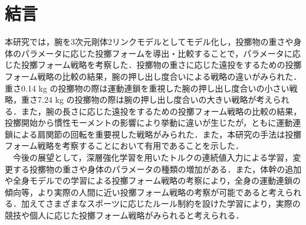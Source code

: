 \section{結言}
本研究では，腕を3次元剛体2リンクモデルとしてモデル化し，投擲物の重さや身体のパラメータに応じた投擲フォームを導出・比較することで，パラメータに応じた投擲フォーム戦略を考察した．投擲物の重さに応じた遠投をするための投擲フォーム戦略の比較の結果，腕の押し出し度合いによる戦略の違いがみられた．重さ0.14 kg の投擲物の際は運動連鎖を重視した腕の押し出し度合いの小さい戦略，重さ7.24 kg の投擲物の際は腕の押し出し度合いの大きい戦略が考えられる．また，腕の長さに応じた遠投をするための投擲フォーム戦略の比較の結果，投擲開始から慣性モーメントの影響により挙動に違いが生じたが，ともに運動連鎖による肩関節の回転を重要視した戦略がみられた．また，本研究の手法は投擲フォーム戦略を考察することにおいて有用であることを示した．\\
　今後の展望として，深層強化学習を用いたトルクの連続値入力による学習，変更する投擲物の重さや身体のパラメータの種類の増加がある．また，体幹の追加や全身モデルでの学習による投擲フォーム戦略の考察により，全身の運動連鎖の傾向等，より実際の人間に近い投擲フォーム戦略の考察が可能であると考えられる．加えてさまざまなスポーツに応じたルール制約を設けた学習により，実際の競技や個人に応じた投擲フォーム戦略がみられると考えられる．






